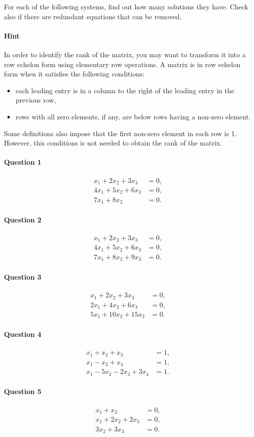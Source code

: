 
For each of the following systems, find out how many solutions they have. 
Check also if there are redundant equations that can be removed.

\paragraph{Hint} In order to identify the rank of the matrix, you may want to
transform it into a row echelon form using elementary row operations. A matrix is in row echelon form  when it satisfies the following conditions:
\begin{itemize}
\item each leading entry is in a column to the right of the leading entry in the previous row,
\item rows with all zero elements, if any, are below rows having a non-zero element.
\end{itemize}
Some definitions also impose that the first non-zero element in each
row is 1. However, this conditions is not needed to obtain the rank of
the matrix. 

\paragraph*{Question 1}
\begin{align*}
x_1+2x_2+3x_3 & = 0,\\
4x_1+5x_2+6x_3 & = 0,\\
7x_1+8x_2& =0.
\end{align*}
\paragraph*{Question 2}
\begin{align*}
x_1+2x_2+3x_3 & = 0,\\
4x_1+5x_2+6x_3 & = 0,\\
7x_1+8x_2+9x_3 & =0.
\end{align*}
\paragraph*{Question 3}

\begin{align*}
x_1+2x_2+3x_3 & = 0,\\
2x_1+4x_2+6x_3 & =0,\\
5x_1+10x_2+15x_3 & =0.
\end{align*}
\paragraph*{Question 4}

\begin{align*}
x_1 + x_2 + x_3 &= 1,\\
x_1 - x_2 + x_4 &= 1, \\
x_1 -5x_2 -2x_3 +3x_4 &= 1.
\end{align*}
\paragraph*{Question 5}

\begin{align*}
x_1+x_2&=0,\\
x_1+2x_2+2x_3&=0,\\
3x_2+3x_3&=0.
\end{align*}

